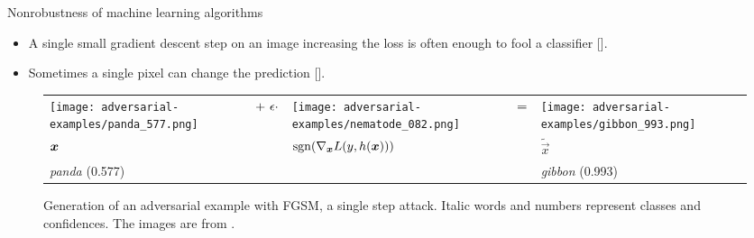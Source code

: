 \documentclass{beamer}
\newcommand{\citet}[1]{{\color{citecolor}\relscale{0.8}\textcite{#1}}}
\newcommand{\citep}[1]{{\color{citecolor}\relscale{0.8}[\textcite{#1}]}}
\begin{document}
\begin{frame}[allowframebreaks=0.9]{Nonrobustness of machine learning algorithms}
	\begin{itemize}
		\item A single small gradient descent step on an image increasing the loss is often enough to fool a classifier \citep{Goodfellow:2014:EHAE}.
		\item Sometimes a single pixel can change the prediction \citep{Su:2017:OPAFDNN}.
	\end{itemize}
	\begin{figure}
	\centering
	{\scriptsize
		\begin{tabular}{>{\centering\arraybackslash}m{}m{.1in}>{\centering\arraybackslash}m{}m{.05in}>{\centering\arraybackslash}m{}}
			\centering\arraybackslash
			\texttt{[image: adversarial-examples/panda\_577.png]} &%
			\centering\arraybackslash%
			$\centering +\ \epsilon \cdot$ &%
			\texttt{[image: adversarial-examples/nematode\_082.png]} &%
			$\centering =$ & %
			\texttt{[image: adversarial-examples/gibbon\_993.png]} \\
			$\centering \vec x$     &%
			& $\sgn\del{\nabla_{\vec x} L(y,h(\vec x))}$ & & $\tilde{\vec x}$ \\
			\emph{panda} (0.577) & & & & \emph{gibbon} (0.993) 
		\end{tabular}
	}
	\caption{Generation of an adversarial example with FGSM, a single step attack. Italic words and numbers represent classes and confidences. The images are from \citet{Goodfellow:2014:EHAE}.}
	\label{fig:fgsm-adversarial-example}
	\end{figure}
\end{frame}
\end{document}
